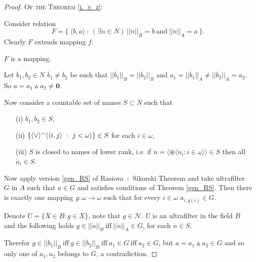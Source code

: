 \begin{proof}{\scshape Of the Theorem \ref{l_s_z}:}
\smallskip

%

Consider relation
$$
F = \{ \ \langle b,a \rangle \ : \ (\exists \dot n \in N) \ ||\dot n ||_B = b \
	\text{and} \ ||\dot n ||_A = a \ \}.
$$
Clearly $F$ extends mapping $f$.

\medskip

$F$ is a mapping.

\smallskip

\noindent Let $\dot{b_1},\dot{b_2} \in N$ $\dot{b_1}\not =\dot{b_2}$ be
such that $||\dot{b_1}||_B = ||\dot{b_2}||_B$ and
$a_1=||\dot{b_1}||_A\neq||\dot{b_2}||_A=a_2$. So
$a=a_1\vartriangle a_2 \not = \mathbf 0$.

Now consider a countable set of names $S \subset N$ such that
\begin{itemize}
\item[(i)]  $\dot{b_1},\dot{b_2} \in S$,
\item[(ii)] $\{\langle \vee\rangle {^\smallfrown}
	\langle \langle i,j \rangle \ : \ j <\omega \rangle \} \in S$
	for each $i \in \omega$,
\item[(iii)] $S$ is closed to names of lower rank, i.e. if
	$\dot n = \langle \circledast \langle \dot n_i : i \in \omega \rangle \rangle \in S$
	then all $\dot n_i \in S$.
\end{itemize}

Now apply version \ref{gen_RS} of Rasiova~-~Sikorski Theorem and
take ultrafilter $G$ in $A$ such that $a \in G$ and satisfies
conditions of Theorem \ref{gen_RS}. Then there is exactly one
mapping $g:\omega \rightarrow \omega$ such that for every $i \in \omega$
$a_{i,g(i)} \in G$.

Denote $U = \{X \in B : g \in X \}$, note that $g \in \mathcal N$. $U$
is an ultrafilter in the field $B$ and the following holds
$g \in ||\dot n||_B \ \mbox{iff} \ ||\dot n||_A \in G$, for each $\dot n \in S$.

Therefor $g \in ||\dot b_1||_B  \ \mbox{iff} \ g \in ||\dot b_2||_B \
\mbox{iff} \ a_1 \in G \ \mbox{iff} \ a_2 \in G$, but $a = a_1 \vartriangle a_2 \in G$
and so only one of $a_1,a_2$ belongs to $G$, a contradiction.
%
%
\end{proof}


